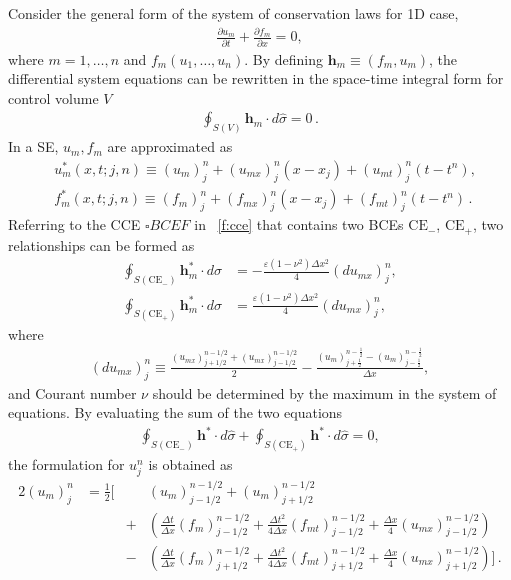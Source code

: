 \documentclass[letterpaper,12pt,dvips]{article}
\renewcommand{\vec}[1]{\mathbf{#1}}
\numberwithin{equation}{section}
\begin{document}
Consider the general form of the system of conservation laws for 1D case, 
\begin{align}
  \frac{\partial u_m}{\partial t} + \frac{\partial f_m}{\partial x} = 0
    , \label{e:syswave}
\end{align}
where $m=1,\ldots,n$ and $f_m(u_1,\ldots,u_n)$.
By defining $\vec{h}_m\equiv(f_m,u_m)$, the differential system equations
can be rewritten in the space-time integral form for control volume $V$
\begin{align*}
\oint_{S(V)}\vec{h}_m\cdot d\hat{\sigma} = 0\,.
\end{align*}
In a SE, $u_m, f_m$ are approximated as 
\begin{align*}
  & u_m^*(x,t;j,n) \equiv (u_m)_j^n + (u_{mx})_j^n(x-x_j)
                        + (u_{mt})_j^n(t-t^n), \\
  & f_m^*(x,t;j,n) \equiv (f_m)_j^n + (f_{mx})_j^n(x-x_j)
                        + (f_{mt})_j^n(t-t^n)  \,.
\end{align*}
Referring to the CCE $\square BCEF$ in \figurename~\ref{f:cce} that 
contains two BCEs $\mathrm{CE}_-$, $\mathrm{CE}_+$, two relationships 
can be formed as
\begin{align*}
  \oint_{S(\mathrm{CE}_-)} \vec{h}_m^*\cdot d\hat{\sigma} &= 
    -\frac{\varepsilon(1-\nu^2)\Delta x^2}{4}(du_{mx})_j^n, \\
  \oint_{S(\mathrm{CE}_+)} \vec{h}_m^*\cdot d\hat{\sigma} &= 
    \frac{\varepsilon(1-\nu^2)\Delta x^2}{4}(du_{mx})_j^n, 
\end{align*}
where
\begin{align}
  (du_{mx})_j^n 
    \equiv \frac{(u_{mx})_{j+1/2}^{n-1/2} 
                + (u_{mx})_{j-1/2}^{n-1/2}}{2}
  - \frac{(u_m)_{j+\frac{1}{2}}^{n-\frac{1}{2}}
        - (u_m)_{j-\frac{1}{2}}^{n-\frac{1}{2}}}
         {\Delta x}, \label{e:dumx}
\end{align}
and Courant number $\nu$ should be determined by the maximum in the system 
of equations.
By evaluating the sum of the two equations
\begin{align*}
    \oint_{S(\mathrm{CE}_-)} \vec{h}^*\cdot d\hat{\sigma} 
  + \oint_{S(\mathrm{CE}_+)} \vec{h}^*\cdot d\hat{\sigma} = 0, 
\end{align*}
the formulation for $u_j^n$ is obtained as 
\begin{alignat*}{2}
  (u_m)_j^n &= \frac{1}{2}\Big[
      &&(u_m)_{j-1/2}^{n-1/2}+(u_m)_{j+1/2}^{n-1/2} \\
  & &+ &\left( 
        \frac{\Delta t}{\Delta x}(f_m)_{j-1/2}^{n-1/2} 
      + \frac{\Delta t^2}{4\Delta x}(f_{mt})_{j-1/2}^{n-1/2}
      + \frac{\Delta x}{4}(u_{mx})_{j-1/2}^{n-1/2} 
      \right) \\
  & &- &\left( 
        \frac{\Delta t}{\Delta x}(f_m)_{j+1/2}^{n-1/2} 
      + \frac{\Delta t^2}{4\Delta x}(f_{mt})_{j+1/2}^{n-1/2}
      + \frac{\Delta x}{4}(u_{mx})_{j+1/2}^{n-1/2} 
      \right) 
    \Big]\,.
\end{alignat*}
\end{document}
